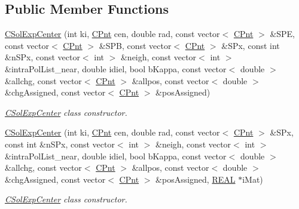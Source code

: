 \subsection*{Public Member Functions}
\begin{DoxyCompactItemize}
\item 
\hyperlink{classCSolExpCenter_a832f4e5161ce855c857942952f49f562}{C\-Sol\-Exp\-Center} (int ki, \hyperlink{classCPnt}{C\-Pnt} cen, double rad, const vector$<$ \hyperlink{classCPnt}{C\-Pnt} $>$ \&S\-P\-E, const vector$<$ \hyperlink{classCPnt}{C\-Pnt} $>$ \&S\-P\-B, const vector$<$ \hyperlink{classCPnt}{C\-Pnt} $>$ \&S\-Px, const int \&n\-S\-Px, const vector$<$ int $>$ \&neigh, const vector$<$ int $>$ \&intra\-Pol\-List\-\_\-near, double idiel, bool b\-Kappa, const vector$<$ double $>$ \&allchg, const vector$<$ \hyperlink{classCPnt}{C\-Pnt} $>$ \&allpos, const vector$<$ double $>$ \&chg\-Assigned, const vector$<$ \hyperlink{classCPnt}{C\-Pnt} $>$ \&pos\-Assigned)
\begin{DoxyCompactList}\small\item\em \hyperlink{classCSolExpCenter}{C\-Sol\-Exp\-Center} class constructor. \end{DoxyCompactList}\item 
\hyperlink{classCSolExpCenter_a2a239ef180a471d6aea6d750e09b70b8}{C\-Sol\-Exp\-Center} (int ki, \hyperlink{classCPnt}{C\-Pnt} cen, double rad, const vector$<$ \hyperlink{classCPnt}{C\-Pnt} $>$ \&S\-Px, const int \&n\-S\-Px, const vector$<$ int $>$ \&neigh, const vector$<$ int $>$ \&intra\-Pol\-List\-\_\-near, double idiel, bool b\-Kappa, const vector$<$ double $>$ \&allchg, const vector$<$ \hyperlink{classCPnt}{C\-Pnt} $>$ \&allpos, const vector$<$ double $>$ \&chg\-Assigned, const vector$<$ \hyperlink{classCPnt}{C\-Pnt} $>$ \&pos\-Assigned, \hyperlink{util_8h_a5821460e95a0800cf9f24c38915cbbde}{R\-E\-A\-L} $\ast$i\-Mat)
\begin{DoxyCompactList}\small\item\em \hyperlink{classCSolExpCenter}{C\-Sol\-Exp\-Center} class constructor. \end{DoxyCompactList}\item 

\end{DoxyCompactItemize}
